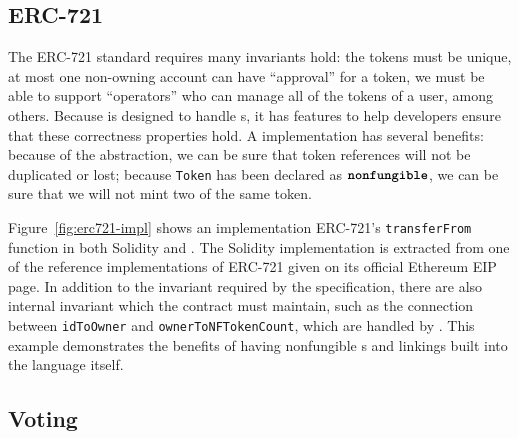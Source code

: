 \documentclass[dvipsnames, usenames, sigconf]{acmart}
\begin{document}
\subsection{ERC-721}\label{sec:erc721-impl}
\begin{figure*}[h]
    \centering
    \begin{minipage}[t]{0.5\textwidth}
        
    \end{minipage}%
    \begin{minipage}[t]{0.5\textwidth}
        
    \end{minipage}
    \caption{A Solidity and a \langName implementation of the \lstinline{transferFrom} function of the ERC-721 standard.}
    \label{fig:erc721-impl}
\end{figure*}

The ERC-721 standard  requires many invariants hold:
    the tokens must be unique,
    at most one non-owning account can have ``approval'' for a token,
    we must be able to support ``operators'' who can manage all of the tokens of a user,
    among others.
Because \langName is designed to handle \assetTxt{}s, it has features to help developers ensure that these correctness properties hold.
A \langName implementation has several benefits: because of the \assetTxt abstraction, we can be sure that token references will not be duplicated or lost; because \lstinline{Token} has been declared as $\textbf{\texttt{nonfungible}}$, we can be sure that we will not mint two of the same token.

Figure~\ref{fig:erc721-impl} shows an implementation ERC-721's \lstinline{transferFrom} function in both Solidity and \langName.
The Solidity implementation is extracted from one of the reference implementations of ERC-721 given on its official Ethereum EIP page.
In addition to the invariant required by the specification, there are also internal invariant which the contract must maintain, such as the connection between \lstinline{idToOwner} and \lstinline{ownerToNFTokenCount}, which are handled by \langName.
This example demonstrates the benefits of having nonfungible \assetTxt{}s and linkings built into the language itself.

\subsection{Voting}
\begin{figure*}[h]
    \centering
    \begin{minipage}[t]{0.5\textwidth}
        
    \end{minipage}%
    \begin{minipage}[t]{0.5\textwidth}
        
    \end{minipage}
    \caption{A Solidity and a \langName implementation of a simple voting contract.}
    \label{fig:voting-impl}
\end{figure*}
\end{document}
